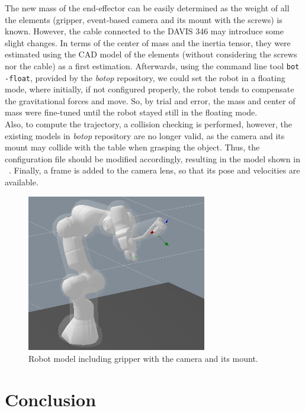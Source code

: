 The new mass of the end-effector can be easily determined as the weight of all the elements (gripper, event-based camera and its mount with the screws) is known. However, the cable connected to the DAVIS 346 may introduce some slight changes. In terms of the center of mass and the inertia tensor, they were estimated using the CAD model of the elements (without considering the screws nor the cable) as a first estimation. Afterwards, using the command line tool \texttt{bot -float}, provided by the \textit{botop} repository, we could set the robot in a floating mode, where initially, if not configured properly, the robot tends to compensate the gravitational forces and move. So, by trial and error, the mass and center of mass were fine-tuned until the robot stayed still in the floating mode.\\

Also, to compute the trajectory, a collision checking is performed, however, the existing models in \textit{botop} repository are no longer valid, as the camera and its mount may collide with the table when grasping the object. Thus, the configuration file should be modified accordingly, resulting in the model shown in ~. Finally, a frame is added to the camera lens, so that its pose and velocities are available.

\begin{figure}[H]
    \centering
    \includegraphics[width=0.7\textwidth]{resources/images/collision}
    \caption{Robot model including gripper with the camera and its mount.}\label{fig:collision}
\end{figure}

\section{Conclusion}

